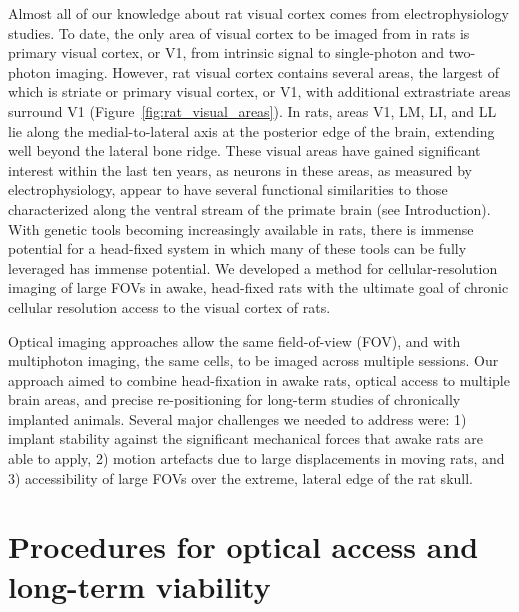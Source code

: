 Almost all of our knowledge about rat visual cortex comes from electrophysiology studies. To date, the only area of visual cortex to be imaged from in rats is primary visual cortex, or V1, from intrinsic signal \cite{Gias2004} to single-photon \cite{Scott2018ImagingMacroscope} and two-photon \cite{Ohki2005, Greenberg2008} imaging. However, rat visual cortex contains several areas, the largest of which is striate or primary visual cortex, or V1, with additional extrastriate areas surround V1 \cite{Espinoza1983RetinotopicRat, Sereno1991} (Figure~\ref{fig:rat_visual_areas}). In rats, areas V1, LM, LI, and LL lie along the medial-to-lateral axis at the posterior edge of the brain, extending well beyond the lateral bone ridge. These visual areas have gained significant interest within the last ten years, as neurons in these areas, as measured by electrophysiology, appear to have several functional similarities to those characterized along the ventral stream of the primate brain (see Introduction). With genetic tools becoming increasingly available in rats, there is immense potential for a head-fixed system in which many of these tools can be fully leveraged has immense potential. We developed a method for cellular-resolution imaging of large FOVs in awake, head-fixed rats with the ultimate goal of chronic cellular resolution access to the visual cortex of rats. 

Optical imaging approaches allow the same field-of-view (FOV), and with multiphoton imaging, the same cells, to be imaged across multiple sessions. Our approach aimed to combine head-fixation in awake rats, optical access to multiple brain areas, and precise re-positioning for long-term studies of chronically implanted animals. Several major challenges we needed to address were:  1) implant stability against the significant mechanical forces that awake rats are able to apply, 2) motion artefacts due to large displacements in moving rats, and 3) accessibility of large FOVs over the extreme, lateral edge of the rat skull.


\section{Procedures for optical access and long-term viability} 

